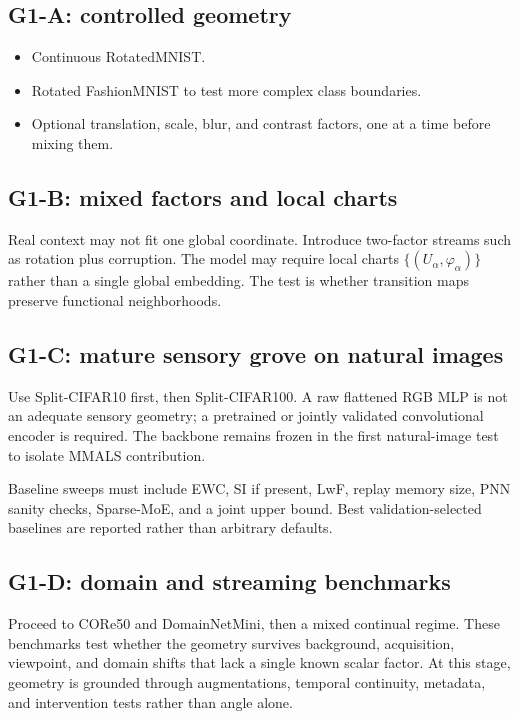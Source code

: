 \documentclass[11pt,a4paper]{article}
\begin{document}
\subsection{G1-A: controlled geometry}

\begin{itemize}
\item Continuous RotatedMNIST.
\item Rotated FashionMNIST to test more complex class boundaries.
\item Optional translation, scale, blur, and contrast factors, one at a time before mixing them.
\end{itemize}

\subsection{G1-B: mixed factors and local charts}

Real context may not fit one global coordinate. Introduce two-factor streams such as rotation plus corruption. The model may require local charts \(\{(U_\alpha,\varphi_\alpha)\}\) rather than a single global embedding. The test is whether transition maps preserve functional neighborhoods.

\subsection{G1-C: mature sensory grove on natural images}

Use Split-CIFAR10 first, then Split-CIFAR100. A raw flattened RGB MLP is not an adequate sensory geometry; a pretrained or jointly validated convolutional encoder is required. The backbone remains frozen in the first natural-image test to isolate MMALS contribution.

Baseline sweeps must include EWC, SI if present, LwF, replay memory size, PNN sanity checks, Sparse-MoE, and a joint upper bound. Best validation-selected baselines are reported rather than arbitrary defaults.

\subsection{G1-D: domain and streaming benchmarks}

Proceed to CORe50 and DomainNetMini, then a mixed continual regime. These benchmarks test whether the geometry survives background, acquisition, viewpoint, and domain shifts that lack a single known scalar factor. At this stage, geometry is grounded through augmentations, temporal continuity, metadata, and intervention tests rather than angle alone.
\end{document}
